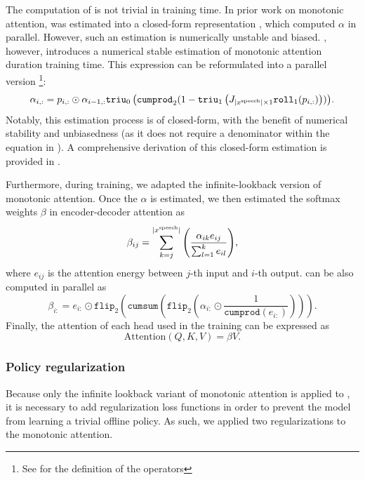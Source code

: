 The computation of  is not trivial in training time.
In prior work on monotonic attention,
 was estimated into a closed-form representation \citep{raffel_online_2017}, 
which computed $\alpha$ in parallel.
However, such an estimation is numerically unstable and biased.
\emma, however,
introduces a numerical stable estimation of monotonic attention duration training time.
This expression can be reformulated into a parallel version \citep{ma_efficient_2023} \footnote{See  for the definition of the operators}:
\begin{equation}
\alpha_{i,:} = p_{i,:} \odot \alpha_{i-1, :} \texttt{triu}_0\left(\texttt{cumprod}_2(1 - \texttt{triu}_1\left( J_{|x^{\text{speech}}| \times 1} \texttt{roll}_1(p_{i,:}) \right))\right)\!.
	\label{eq:emma}
\end{equation}
Notably, this estimation process is of closed-form, with the benefit of numerical stability and unbiasedness (as it does not require a denominator within the equation in \citep{raffel_online_2017}).
A comprehensive derivation of this closed-form estimation is provided in .

Furthermore, during training, we adapted the infinite-lookback \citep{arivazhagan_monotonic_2019, ma_monotonic_2019} version of monotonic attention. Once the $\alpha$ is estimated, we then estimated the softmax weights $\beta$ in encoder-decoder attention as
\begin{equation}
    \label{eq:streaming:milk}
   \beta_{ij} = \sum_{k=j}^{|x^{\text{speech}}|} \left( \frac{\alpha_{ik} e_{ij}}{\sum_{l=1}^k  e_{il}} \right)\!,
\end{equation}
where $e_{ij}$ is the attention energy between $j$-th input and $i$-th output.
 can be also computed in parallel as
\begin{equation}
     \beta_{i:} = e_{i:} \odot  \texttt{flip}_2 \left( \texttt{cumsum} \left( \texttt{flip}_2 \left(\alpha_{i:} \odot  \frac{1}{ \texttt{cumprod} \left( e_{i:} \right)} \right) \right) \right)\!.
\end{equation}
Finally, the attention of each head used in the training can be expressed as
\begin{equation}
    \text{Attention}(Q, K, V) = \beta V. 
\end{equation}

\subsubsection{Policy regularization}
Because only the infinite lookback variant of monotonic attention is applied to \seamlessstreaming, it is necessary to add regularization loss functions in order to prevent the model from learning a trivial offline policy. As such, we applied two regularizations to the monotonic attention.


